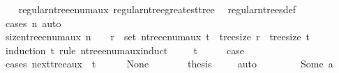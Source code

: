 \begin{isabellebody}
%
\isadelimproof
\ \ %
\endisadelimproof
%
\isatagproof
{}\isamarkupfalse%
\ regular{\isacharunderscore}{\kern0pt}n{\isacharunderscore}{\kern0pt}tree{\isacharunderscore}{\kern0pt}enum{\isacharunderscore}{\kern0pt}aux\ regular{\isacharunderscore}{\kern0pt}n{\isacharunderscore}{\kern0pt}tree{\isacharunderscore}{\kern0pt}greatest{\isacharunderscore}{\kern0pt}tree\ \isamarkupfalse%
\ regular{\isacharunderscore}{\kern0pt}n{\isacharunderscore}{\kern0pt}trees{\isacharunderscore}{\kern0pt}def\ \isamarkupfalse%
\ {\isacharparenleft}{\kern0pt}cases\ n{\isacharparenright}{\kern0pt}\ auto%
\endisatagproof
{\isafoldproof}%
%
\isadelimproof
\isanewline
%
\endisadelimproof
\isanewline
\isanewline
{}\isamarkupfalse%
\ size{\isacharunderscore}{\kern0pt}n{\isacharunderscore}{\kern0pt}tree{\isacharunderscore}{\kern0pt}enum{\isacharunderscore}{\kern0pt}aux{\isacharcolon}{\kern0pt}\ {\isachardoublequoteopen}n\ {\isasymnoteq}\ {}\ {\isasymLongrightarrow}\ r\ {\isasymin}\ set\ {\isacharparenleft}{\kern0pt}n{\isacharunderscore}{\kern0pt}tree{\isacharunderscore}{\kern0pt}enum{\isacharunderscore}{\kern0pt}aux\ t{\isacharparenright}{\kern0pt}\ {\isasymLongrightarrow}\ tree{\isacharunderscore}{\kern0pt}size\ r\ {\isacharequal}{\kern0pt}\ tree{\isacharunderscore}{\kern0pt}size\ t{\isachardoublequoteclose}\isanewline
%
\isadelimproof
%
\endisadelimproof
%
\isatagproof
{}\isamarkupfalse%
\ {\isacharparenleft}{\kern0pt}induction\ t\ rule{\isacharcolon}{\kern0pt}\ n{\isacharunderscore}{\kern0pt}tree{\isacharunderscore}{\kern0pt}enum{\isacharunderscore}{\kern0pt}aux{\isachardot}{\kern0pt}induct{\isacharparenright}{\kern0pt}\isanewline
\ \ \isamarkupfalse%
\ {\isacharparenleft}{\kern0pt}{}\ t{\isacharparenright}{\kern0pt}\isanewline
\ \ \isamarkupfalse%
\ \isamarkupfalse%
\ {\isacharquery}{\kern0pt}case\isanewline
\ \ \isamarkupfalse%
\ {\isacharparenleft}{\kern0pt}cases\ {\isachardoublequoteopen}next{\isacharunderscore}{\kern0pt}tree{\isacharunderscore}{\kern0pt}aux\ {}\ t{\isachardoublequoteclose}{\isacharparenright}{\kern0pt}\isanewline
\ \ \ \ \isamarkupfalse%
\ None\isanewline
\ \ \ \ \isamarkupfalse%
\ \isamarkupfalse%
\ {\isacharquery}{\kern0pt}thesis\ \isamarkupfalse%
\ {}\ \isamarkupfalse%
\ auto\isanewline
\ \ \isamarkupfalse%
\isanewline
\ \ \ \ \isamarkupfalse%
\ {\isacharparenleft}{\kern0pt}Some\ a{\isacharparenright}{\kern0pt}\isanewline

\end{isabellebody}
